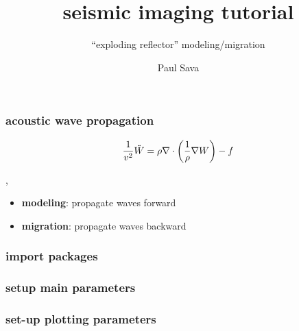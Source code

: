 


\title[]{seismic imaging tutorial}
\subtitle{``exploding reflector'' modeling/migration}
\author[]{Paul Sava}
\date{}
\logo{}
\large

\def\big#1{\begin{center} \LARGE \textbf{#1} \end{center}}
\def\cen#1{\begin{center}        \textbf{#1} \end{center}}

 { \cwpcover }


\begin{frame} \frametitle{acoustic wave propagation}

\[
\frac{1}{v^2} \ddot{W} = 
\rho \nabla \cdot {\left (\frac{1}{\rho} \nabla {W} \right)} -f
\]

\sep

\begin{itemize}
   \item \textbf{modeling}: propagate waves forward
   \item \textbf{migration}: propagate waves backward 
\end{itemize}

\end{frame}
\cwpnote{}

\begin{frame} \frametitle{import packages}
    
\end{frame}
\cwpnote{}

\begin{frame} \frametitle{setup main parameters}

\end{frame}
\cwpnote{}

\begin{frame} \frametitle{set-up plotting parameters}

\end{frame}
\cwpnote{}

